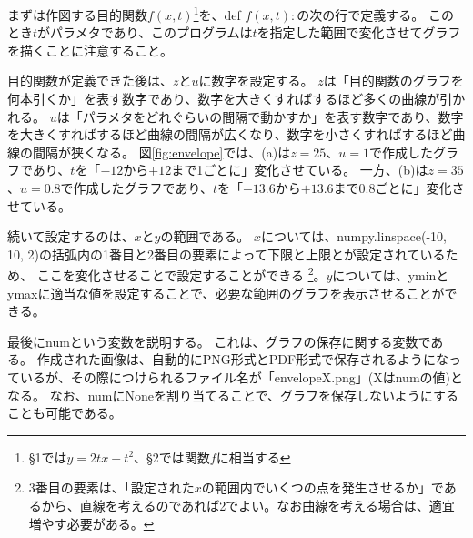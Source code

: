 \documentclass[11pt,a4j]{jarticle}
\begin{document}
まずは作図する目的関数$f(x,t)$\footnote{\S1では$y=2tx-t^{2}$、\S2では関数$f$に相当する}を、def $f(x,t):$の次の行で定義する。
このとき$t$がパラメタであり、このプログラムは$t$を指定した範囲で変化させてグラフを描くことに注意すること。

目的関数が定義できた後は、$z$と$u$に数字を設定する。
$z$は「目的関数のグラフを何本引くか」を表す数字であり、数字を大きくすればするほど多くの曲線が引かれる。
$u$は「パラメタをどれぐらいの間隔で動かすか」を表す数字であり、数字を大きくすればするほど曲線の間隔が広くなり、数字を小さくすればするほど曲線の間隔が狭くなる。
図\ref{fig:envelope}では、(a)は$z=25$、$u=1$で作成したグラフであり、$t$を「$-12$から$+12$まで1ごとに」変化させている。
一方、(b)は$z=35$、$u=0.8$で作成したグラフであり、$t$を「$-13.6$から$+13.6$まで0.8ごとに」変化させている。

続いて設定するのは、$x$と$y$の範囲である。
$x$については、numpy.linspace(-10, 10, 2)の括弧内の1番目と2番目の要素によって下限と上限とが設定されているため、
ここを変化させることで設定することができる
\footnote{3番目の要素は、「設定された$x$の範囲内でいくつの点を発生させるか」であるから、直線を考えるのであれば2でよい。なお曲線を考える場合は、適宜増やす必要がある。}。$y$については、yminとymaxに適当な値を設定することで、必要な範囲のグラフを表示させることができる。

最後にnumという変数を説明する。
これは、グラフの保存に関する変数である。
作成された画像は、自動的にPNG形式とPDF形式で保存されるようになっているが、その際につけられるファイル名が「envelopeX.png」(Xはnumの値)となる。
なお、numにNoneを割り当てることで、グラフを保存しないようにすることも可能である。
\end{document}

